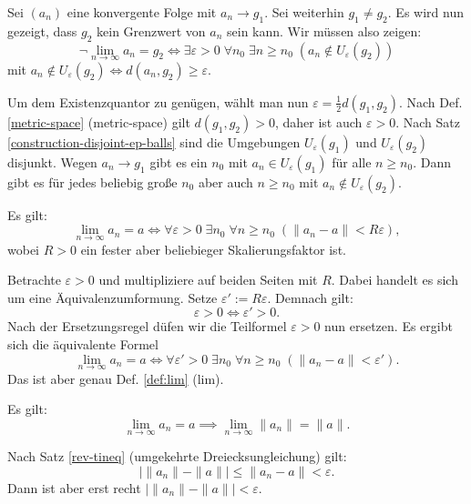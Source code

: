 \begin{Beweis}
Sei $(a_n)$ eine konvergente Folge mit $a_n\to g_1$. Sei weiterhin
$g_1\ne g_2$. Es wird nun gezeigt, dass $g_2$ kein Grenzwert von $a_n$
sein kann. Wir müssen also zeigen:
\[\neg\lim_{n\to\infty} a_n=g_2 \iff
\exists\varepsilon{>}0\;\forall n_0\;\exists n{\ge}n_0\;
(a_n\notin U_\varepsilon(g_2))\]
mit $a_n\notin U_\varepsilon(g_2)\iff d(a_n,g_2)\ge\varepsilon$.

Um dem Existenzquantor zu genügen, wählt man nun
$\varepsilon = \frac{1}{2}d(g_1,g_2)$.
Nach Def. \ref{metric-space} (metric-space) gilt 
$d(g_1,g_2)>0$, daher ist auch $\varepsilon>0$. Nach Satz
\ref{construction-disjoint-ep-balls} sind die Umgebungen
$U_\varepsilon(g_1)$ und $U_\varepsilon(g_2)$ disjunkt.
Wegen $a_n\to g_1$ gibt es ein $n_0$ mit $a_n\in U_\varepsilon(g_1)$ für alle
$n\ge n_0$. Dann gibt es für jedes beliebig große $n_0$ aber auch
$n\ge n_0$ mit $a_n\notin U_\varepsilon(g_2)$.\,\qedsymbol
\end{Beweis}

\begin{Satz}\label{lim-scaled-ep}
Es gilt:
\[\lim_{n\to\infty} a_n=a \iff
\forall\varepsilon{>}0\;\exists n_0\;\forall n{\ge}n_0\;(\|a_n-a\|<R\varepsilon),\]
wobei $R>0$ ein fester aber beliebieger Skalierungsfaktor ist.
\end{Satz}

\begin{Beweis}
Betrachte $\varepsilon>0$ und multipliziere auf beiden Seiten
mit $R$. Dabei handelt es sich um eine Äquivalenzumformung.
Setze $\varepsilon':=R\varepsilon$. Demnach gilt:
\[\varepsilon>0 \iff \varepsilon'>0.\]
Nach der Ersetzungsregel düfen wir die Teilformel $\varepsilon>0$
nun ersetzen. Es ergibt sich die äquivalente Formel
\[\lim_{n\to\infty} a_n=a \iff
\forall\varepsilon'{>}0\;\exists n_0\;\forall n{\ge}n_0\;
(\|a_n-a\|<\varepsilon').\]
Das ist aber genau Def. \ref{def:lim} (lim).\,\qedsymbol
\end{Beweis}

\begin{Satz}
Es gilt:
\[\lim_{n\to\infty} a_n = a\implies \lim_{n\to\infty} \|a_n\| = \|a\|.\]
\end{Satz}

\begin{Beweis}
Nach Satz \ref{rev-tineq} (umgekehrte Dreiecksungleichung) gilt:
\[|\|a_n\|-\|a\|| \le \|a_n-a\| < \varepsilon.\]
Dann ist aber erst recht $|\|a_n\|-\|a\||<\varepsilon$.\,\qedsymbol
\end{Beweis}

